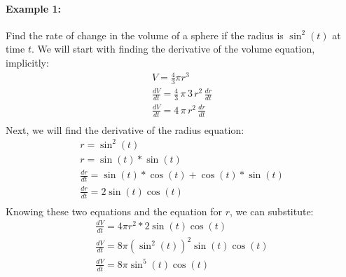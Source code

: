 \documentclass[../revisedmain.tex]{subfiles}
\begin{document}
	\paragraph{Example 1:} Find the rate of change in the volume of a sphere if the radius is $\sin^2(t)$ at time $t$.
	We will start with finding the derivative of the volume equation, implicitly:
	\begin{gather*}
		V=\frac{4}{3}\pi r^3\\
		\frac{dV}{dt}=\frac{4}{3}\,\pi\, 3\,r^2\, \frac{dr}{dt}\\
		\frac{dV}{dt}=4\,\pi\, r^2\,\frac{dr}{dt}\\
		\end{gather*}Next, we will find the derivative of the radius equation:
		\begin{gather*}
		r=\sin^2(t)\\
		r=\sin(t)*\sin(t)\\
		\frac{dr}{dt}=\sin(t)*\cos(t)+\cos(t)*\sin(t)\\
		\frac{dr}{dt}=2\sin(t)\cos(t)\\
	\end{gather*}Knowing these two equations and the equation for $r$, we can substitute:
\begin{gather*}
	\frac{dV}{dt}=4\pi r^2*2\sin(t)\cos(t)\\
	\frac{dV}{dt}=8\pi (\sin^2(t))^2 \sin(t)\cos(t)\\
	\frac{dV}{dt}=8\pi \sin^5(t)\cos(t)\\
\end{gather*}
\end{document}
